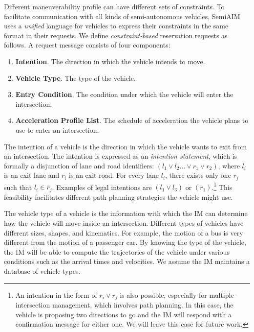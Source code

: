 Different maneuverability profile can have different sets of
constraints.  To facilitate communication with all kinds of
semi-autonomous vehicles, SemiAIM uses a \emph{unified}
language for vehicles to express their constraints in the same format
in their requests.  We define \emph{constraint-based} reservation
requests as follows.  A request message consists of four components:
\begin{enumerate}
\setlength{\rightmargin}{0em}
\setlength{\leftmargin}{1em}
\setlength{\itemsep}{0em}
\setlength{\topsep}{0em}
\setlength{\parsep}{0em}
\setlength{\parskip}{0pt}
\item{\bf Intention}. The direction in which the vehicle intends to
  move.
\item{\bf Vehicle Type}. The type of the vehicle.
\item{\bf Entry Condition}. The condition under which the vehicle
  will enter the intersection.
\item{\bf Acceleration Profile List}. The schedule of acceleration
  the vehicle plans to use to enter an intersection.
\end{enumerate}
The intention of a vehicle is the direction in which the vehicle wants
to exit from an intersection.  The intention is expressed as an
\emph{intention statement}, which is formally a disjunction of lane
and road identifiers: $(l_1 \vee l_2 \ldots \vee r_1 \vee r_2)$, where
$l_i$ is an exit lane and $r_i$ is an exit road. For every lane $l_i$,
there exists only one $r_j$ such that $l_i \in r_j$. 
Examples of legal intentions are $(l_1 \vee l_3)$ or
$(r_1)$.\footnote{An intention in the form of $r_i \vee r_j$ is also possible,
especially for multiple-intersection management, which involves path
planning. In this case, the vehicle is proposing two directions to go
and the IM will respond with a confirmation message for either one. We
will leave this case for future work.}
This feasibility facilitates different path planning strategies the
vehicle might use.

The vehicle type of a vehicle is the information with which the IM can
determine how the vehicle will move inside an intersection.  Different
types of vehicles have different sizes, shapes, and kinematics.  For
example, the motion of a bus is very different from the motion of a
passenger car.  By knowing the type of the vehicle, the IM will be
able to compute the trajectories of the vehicle under various conditions
such as the arrival times and velocities. We assume the IM maintains
a database of vehicle types.

